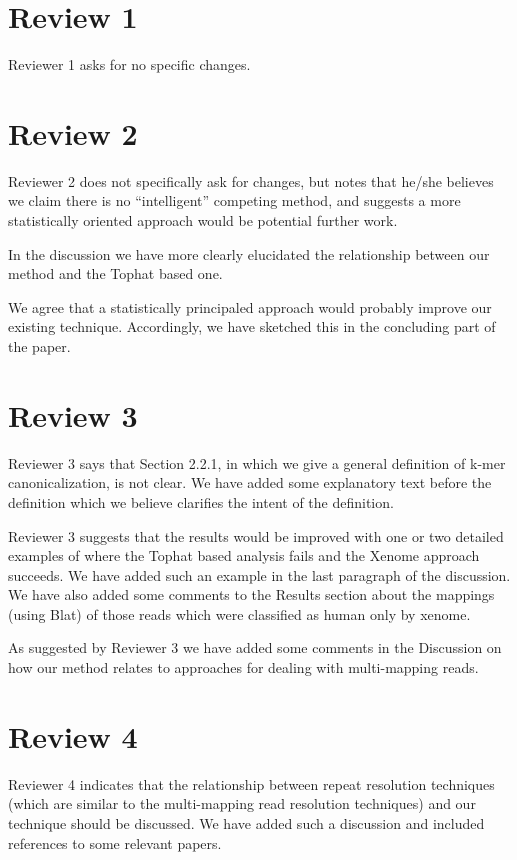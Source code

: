 \documentclass{article}
\begin{document}
\section*{Review 1}

Reviewer 1 asks for no specific changes.

\section*{Review 2}

Reviewer 2 does not specifically ask for changes, but notes that he/she believes we claim there is no
``intelligent'' competing method, and suggests a more statistically oriented approach would be
potential further work.

In the discussion we have more clearly elucidated the relationship between our method and the Tophat based one.

We agree that a statistically principaled approach would probably improve our existing technique.
Accordingly, we have sketched this in the concluding part of the paper.

\section*{Review 3}

Reviewer 3 says that Section 2.2.1, in which we give a general definition of k-mer canonicalization,
is not clear. We have added some explanatory text before the definition which we believe clarifies the intent of the definition.

Reviewer 3 suggests that the results would be improved with one or
two detailed examples of where the Tophat based analysis fails and
the Xenome approach succeeds.
We have added such an example in the last paragraph of the discussion. 
We have also added some comments to the Results section about the mappings (using Blat) of those reads which were classified as human only by
xenome.

As suggested by Reviewer 3 we have added some comments in the Discussion on how our method relates to approaches for dealing with
multi-mapping reads.

\section*{Review 4}

Reviewer 4 indicates that the relationship between repeat resolution techniques (which are similar
to the multi-mapping read resolution techniques) and our technique should be discussed.
We have added such a discussion and included references to some relevant papers.
\end{document}
